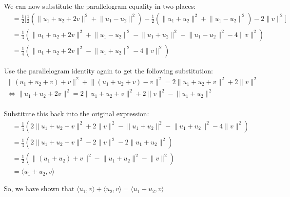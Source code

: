 \documentclass[12pt]{article}
\begin{document}
\begin{enumerate}[label=\alph*)]
\begin{itemize}
\begin{itemize}
            We can now substitute the parallelogram equality in two places:
            $$
            \begin{aligned}
                &= \frac{1}{2} \bigg[ \frac{1}{2} \left( \lVert u_1 + u_2 + 2v \rVert^2 + \lVert u_1 - u_2 \rVert^2 \right)
                - \frac{1}{2} \left( \lVert u_1 + u_2 \rVert^2 + \lVert u_1 - u_2 \rVert^2 \right) - 2\lVert v \rVert^2 \bigg] \\
                &= \frac{1}{4} \left( \lVert u_1 + u_2 + 2v \rVert^2 + \lVert u_1 - u_2 \rVert^2 - \lVert u_1 + u_2 \rVert^2 - \lVert u_1 - u_2 \rVert^2 - 4\lVert v \rVert^2 \right) \\
                &= \frac{1}{4} \left( \lVert u_1 + u_2 + 2v \rVert^2 - \lVert u_1 + u_2 \rVert^2 - 4\lVert v \rVert^2 \right)
            \end{aligned}
            $$

            Use the parallelogram identity again to get the following substitution:
            $$
            \begin{aligned}
                \lVert (u_1 + u_2 + v) + v \rVert^2 + \lVert(u_1 + u_2 + v) - v \rVert^2 = 2 \lVert u_1 + u_2 + v \rVert^2 + 2 \lVert v \rVert^2 \\
                \iff \lVert u_1 + u_2 + 2v \rVert^2 = 2 \lVert u_1 + u_2 + v \rVert^2 + 2 \lVert v \rVert^2 - \lVert u_1 + u_2 \rVert^2 \\
            \end{aligned}
            $$

            Substitute this back into the original expression:
            $$
            \begin{aligned}
                &= \frac{1}{4} \left(2 \lVert u_1 + u_2 + v \rVert^2 + 2 \lVert v \rVert^2 - \lVert u_1 + u_2 \rVert^2 - \lVert u_1 + u_2 \rVert^2 - 4\lVert v \rVert^2 \right) \\
                &= \frac{1}{4} \left(2 \lVert u_1 + u_2 + v \rVert^2 - 2 \lVert v \rVert^2 - 2 \lVert u_1 + u_2 \rVert^2 \right) \\
                &= \frac{1}{2} \left(\lVert (u_1 + u_2) + v \rVert^2 - \lVert u_1 + u_2 \rVert^2 - \lVert v \rVert^2 \right) \\
                &= \langle u_1 + u_2, v \rangle
            \end{aligned}
            $$

            So, we have shown that $\langle u_1, v \rangle + \langle u_2, v \rangle = \langle u_1 + u_2, v \rangle$


\end{itemize}
\end{itemize}
\end{enumerate}
\end{document}
